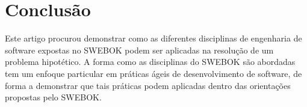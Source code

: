 \documentclass[12pt,journal,compsoc]{IEEEtran}
\begin{document}
\section{Conclusão}

Este artigo procurou demonstrar como as diferentes disciplinas de engenharia de software expostas no SWEBOK podem ser aplicadas na resolução de um problema hipotético. A forma como as disciplinas do SWEBOK são abordadas tem um enfoque particular em práticas ágeis de desenvolvimento de software, de forma a demonstrar que tais práticas podem aplicadas dentro das orientações propostas pelo SWEBOK.



\end{document}
